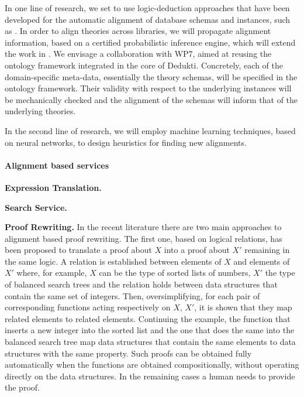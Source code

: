 In one line of research, we set to use logic-deduction approaches that
have been developed for the automatic alignment of database schemas
and instances, such as \cite{}.  In order to align theories across
libraries, we will propagate alignment information, based on a
certified probabilistic inference engine, which will extend the work
in \cite{}. We envisage a collaboration with WP7, aimed at reusing the
ontology framework integrated in the core of Dedukti. Concretely, each
of the domain-specific meta-data, essentially the theory schemas, will
be specified in the ontology framework. Their validity with respect to
the underlying instances will be mechanically checked and the
alignment of the schemas will inform that of the underlying theories.

In the second line of research, we will employ machine learning
techniques, based on neural networks, to design heuristics for finding
new alignments.

\paragraph{Alignment based services}

\textbf{Expression Translation.}

\textbf{Search Service.}

\textbf{Proof Rewriting.} In the recent literature there are two main
approaches to alignment based proof rewriting. The first one, based on
logical relations, has been proposed to translate a proof about $X$
into a proof about $X'$ remaining in the same logic. A relation is
established between elements of $X$ and elements of $X'$ where, for
example, $X$ can be the type of sorted lists of numbers, $X'$ the type
of balanced search trees and the relation holds between data
structures that contain the same set of integers. Then,
oversimplifying, for each pair of corresponding functions acting
respectively on $X$, $X'$, it is shown that they map related elements
to related elements. Continuing the example, the function that inserts
a new integer into the sorted list and the one that does the same into
the balanced search tree map data structures that contain the same
elements to data structures with the same property. Such proofs can be
obtained fully automatically when the functions are obtained
compositionally, without operating directly on the data structures. In
the remaining cases a human needs to provide the proof.

